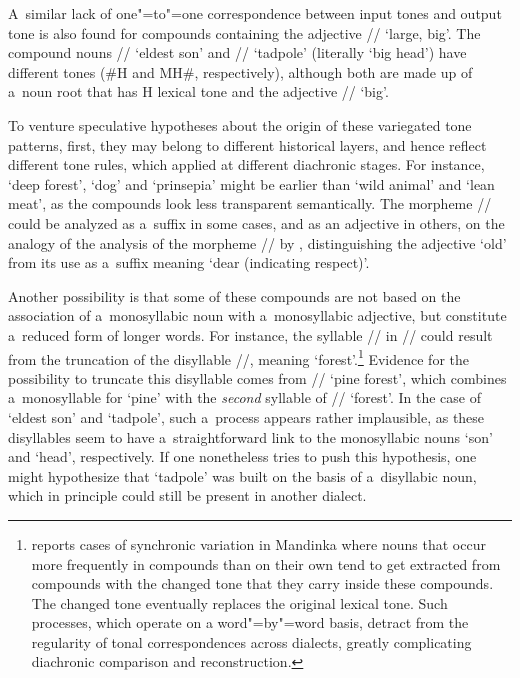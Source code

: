 A~similar lack of one"=to"=one {correspondence} between input tones and output tone is also found for compounds containing the adjective // ‘large, big’. The compound nouns //
‘eldest son’ and // ‘tadpole’ (literally ‘big head’) have different tones (\#H and
MH\#, respectively), although both are made up of a~noun root that has H lexical tone and the
adjective // ‘big’.

To venture speculative hypotheses about the origin of these variegated tone patterns, first,
they may belong to different historical layers, and hence reflect different tone rules, which applied at different {diachronic} stages. For instance, ‘deep forest’, ‘dog’ and ‘prinsepia’ might be earlier than ‘wild animal’ and
‘lean meat’, as the compounds look less transparent semantically. The morpheme // could be analyzed as a~suffix in some cases, and as an adjective in others, on the {analogy} of the analysis of the morpheme // by \citet[182]{lidz2010}, distinguishing the adjective ‘old’ from its use as a~suffix meaning ‘dear (indicating respect)’.

Another possibility is that some of these compounds are not based on the association of
a~{monosyllabic} noun with a~{monosyllabic} adjective, but constitute a~reduced form of longer words. For instance, the syllable // in // could result from the truncation of
the disyllable //, meaning ‘forest’.\footnote{\citet[50-52]{creissels1982} reports cases of synchronic {variation} in {Mandinka} where nouns that occur more frequently in compounds than on their own tend to get extracted from compounds with the changed tone that they carry inside these compounds. The changed tone eventually replaces the original lexical tone. Such processes, which operate on a word"=by"=word basis, detract from the regularity of tonal correspondences across dialects, greatly complicating {diachronic} comparison and {reconstruction}.} Evidence for the possibility to truncate this disyllable comes from // ‘pine forest’, which combines a~{monosyllable} for ‘pine’ with the \textit{second} syllable of // ‘forest’. In the case of ‘eldest son’ and ‘tadpole’, such a~process appears
rather implausible, as these disyllables seem to have a~straightforward link to the {monosyllabic} nouns ‘son’ and
‘head’, respectively. If one nonetheless tries to push this hypothesis, one might hypothesize that
‘tadpole’ was built on the basis of a~disyllabic noun, which in principle could still be present in
another dialect.

